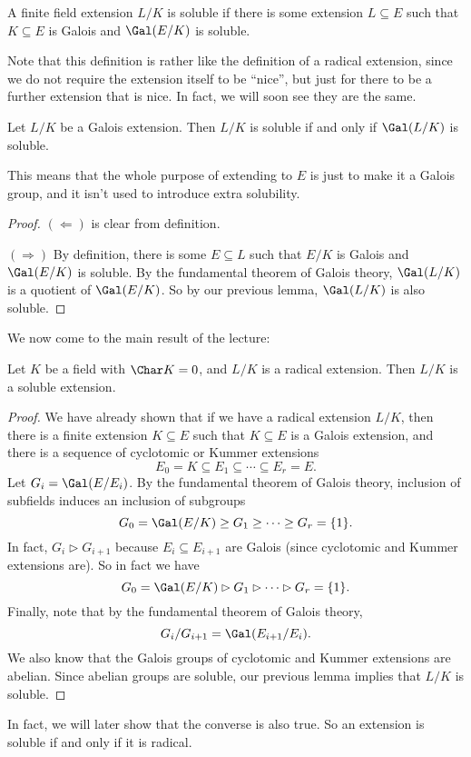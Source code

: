 \documentclass[a4paper]{article}
\begin{document}
\begin{defi}
  A finite field extension $L/K$ is soluble if there is some extension $L\subseteq E$ such that $K\subseteq E$ is Galois and $\Gal(E/K)$ is soluble.
\end{defi}
Note that this definition is rather like the definition of a radical extension, since we do not require the extension itself to be ``nice'', but just for there to be a further extension that is nice. In fact, we will soon see they are the same.

\begin{lemma}
  Let $L/K$ be a Galois extension. Then $L/K$ is soluble if and only if $\Gal(L/K)$ is soluble.
\end{lemma}
This means that the whole purpose of extending to $E$ is just to make it a Galois group, and it isn't used to introduce extra solubility.

\begin{proof}
  $(\Leftarrow)$ is clear from definition.

  $(\Rightarrow)$ By definition, there is some $E\subseteq L$ such that $E/K$ is Galois and $\Gal(E/K)$ is soluble. By the fundamental theorem of Galois theory, $\Gal(L/K)$ is a quotient of $\Gal(E/K)$. So by our previous lemma, $\Gal(L/K)$ is also soluble.
\end{proof}

We now come to the main result of the lecture:
\begin{thm}
  Let $K$ be a field with $\Char K = 0$, and $L/K$ is a radical extension. Then $L/K$ is a soluble extension.
\end{thm}

\begin{proof}
  We have already shown that if we have a radical extension $L/K$, then there is a finite extension $K\subseteq E$ such that $K\subseteq E$ is a Galois extension, and there is a sequence of cyclotomic or Kummer extensions
  \[
    E_0 = K \subseteq E_1 \subseteq \cdots \subseteq E_r = E.
  \]
  Let $G_i = \Gal(E/E_i)$. By the fundamental theorem of Galois theory, inclusion of subfields induces an inclusion of subgroups
  \[
    G_0 = \Gal(E/K) \geq G_1 \geq \cdots \geq G_r = \{1\}.
  \]
  In fact, $G_i \rhd G_{i + 1}$ because $E_i \subseteq E_{i + 1}$ are Galois (since cyclotomic and Kummer extensions are). So in fact we have
  \[
    G_0 = \Gal(E/K) \rhd G_1 \rhd \cdots \rhd G_r = \{1\}.
  \]
  Finally, note that by the fundamental theorem of Galois theory,
  \[
    G_i/G_{i + 1} = \Gal(E_{i + 1}/E_i).
  \]
  We also know that the Galois groups of cyclotomic and Kummer extensions are abelian. Since abelian groups are soluble, our previous lemma implies that $L/K$ is soluble.
\end{proof}
In fact, we will later show that the converse is also true. So an extension is soluble if and only if it is radical.
\end{document}
